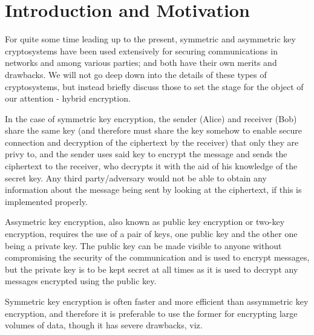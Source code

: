 \section{Introduction and Motivation}
For quite some time leading up to the present, symmetric and asymmetric key cryptosystems have been used extensively for securing communications in networks and among various parties; and both have their own merits and drawbacks. We will not go deep down into the details of these types of cryptosystems, but instead briefly discuss those to set the stage for the object of our attention - hybrid encryption.

In the case of symmetric key encryption, the sender (Alice) and receiver (Bob) share the same key (and therefore must share the key somehow to enable secure connection and decryption of the ciphertext by the receiver) that only they are privy to, and the sender uses said key to encrypt the message and sends the ciphertext to the receiver, who decrypts it with the aid of his knowledge of the secret key. Any third party/adversary would not be able to obtain any information about the message being sent by looking at the ciphertext, if this is implemented properly.\cite{smirnoff_turner_2019}

Assymetric key encryption, also known as public key encryption or two-key encryption, requires the use of a pair of keys, one public key and the other one being a private key. The public key can be made visible to anyone without compromising the security of the communication and is used to encrypt messages, but the private key is to be kept secret at all times as it is used to decrypt any messages encrypted using the public key.

Symmetric key encryption is often faster and more efficient than assymmetric key encryption, and therefore it is preferable to use the former for encrypting large volumes of data, though it has severe drawbacks, viz. 
\label{sec:intro}
